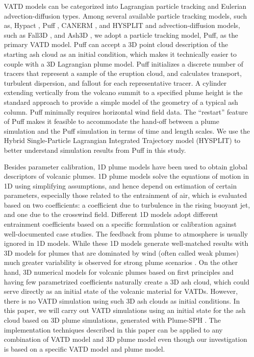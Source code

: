 \documentclass[utf8]{frontiersSCNS} %
\begin{document}
VATD models can be categorized into Lagrangian particle tracking and
Eulerian advection-diffusion types. Among several available particle
tracking models, such as, Hypact \citep{walko1995hypact}, Puff
\citep{searcy1998puff}, CANERM \citep{d1998modeling}, and HYSPLIT
\citep{draxler1998overview} and advection-diffusion models, such as
Fall3D \citep{folch2009fall3d}, and Ash3D \citep{schwaiger2012ash3d},
we adopt a particle tracking model, Puff, as the primary VATD
model. Puff can accept a 3D point cloud description of the starting
ash cloud as an initial condition, which makes it technically easier
to couple with a 3D Lagrangian plume model. Puff initializes a
discrete number of tracers that represent a sample of the eruption
cloud, and calculates transport, turbulent dispersion, and fallout for
each representative tracer. A cylinder extending vertically from the
volcano summit to a specified plume height is the standard approach to
provide a simple model of the geometry of a typical ash column. Puff
minimally requires horizontal wind field data. The ``restart'' feature
of Puff makes it feasible to accommodate the hand-off between a plume
simulation and the Puff simulation in terms of time and length
scales. We use the Hybrid Single-Particle Lagrangian Integrated
Trajectory model (HYSPLIT) \citep{stein2015noaa, rolph2017real} to
better understand simulation results from Puff in this study.

Besides parameter calibration, 1D plume models have been used to obtain global descriptors of volcanic plumes. 1D plume models \citep [e.g.][]{woods1988fluid, bursik2001effect, mastin2007user, de2015plume, folch2016fplume, pouget2016sensitivity} solve the equations of motion in 1D using simplifying assumptions, and hence depend on estimation of certain parameters, especially those related to the entrainment of air, which is evaluated based on two coefficients: a coefficient due to turbulence in the rising buoyant jet, and one due to the crosswind field. Different 1D models adopt different entrainment coefficients based on a specific formulation or calibration against well-documented case studies. The feedback from plume to atmosphere is usually ignored in 1D models. While these 1D models generate well-matched results with 3D models for plumes that are dominated by wind (often called weak plumes) much greater variability is observed for strong plume scenarios \citep{bursik2009volcanic, costa2016results}. On the other hand, 3D numerical models for volcanic plumes based on first principles and having few parametrized coefficients \citep{oberhuber1998volcanic, neri2003multiparticle, suzuki2005numerical, cerminara2016ashee, cao2018plume} naturally create a 3D ash cloud, which could serve directly as an initial state of the volcanic material for VATDs. However, there is no VATD simulation using such 3D ash clouds as initial conditions. In this paper, we will carry out VATD simulations using an initial state for the ash cloud based on 3D plume simulations, generated with Plume-SPH \citep{cao2018plume, cao2017data}. The implementation techniques described in this paper can be applied to any combination of VATD model and 3D plume model even though our investigation is based on a specific VATD model and plume model.
\end{document}
